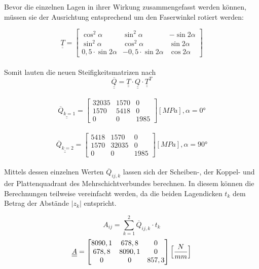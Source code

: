 \noindent Bevor die einzelnen Lagen in ihrer Wirkung zusammengefasst werden können, müssen sie der Ausrichtung entsprechend um den Faserwinkel rotiert werden:

\begin{equation}
	\underline{\underline{T}}=
	\begin{bmatrix}
		\cos^{2}\alpha&\sin^{2}\alpha&-\sin 2\alpha\\
		\sin^{2}\alpha&\cos^{2}\alpha&\sin 2\alpha\\
		0,5\cdot \sin2\alpha&-0,5\cdot\sin2\alpha&\cos 2\alpha
	\end{bmatrix}
\end{equation}\\

\noindent Somit lauten die neuen Steifigkeitsmatrizen nach 
\begin{equation}
	\overline{\underline{\underline{Q}}}=\underline{\underline{T}}\cdot \underline{\underline{Q}} \cdot \underline{\underline{T}}^{T}  
\end{equation}\\

\begin{equation}
\underline{\underline{\overline{Q}_{k=1}}}=
\begin{bmatrix}
	32035 & 1570 & 0\\
	1570 & 5418 & 0\\
	0 & 0 & 1985
\end{bmatrix} [MPa], \alpha = 0°
\end{equation}\\
\begin{equation}
	\underline{\underline{\overline{Q }_{k=2}}}=
	\begin{bmatrix}
		5418 & 1570 & 0\\
		1570 & 32035 & 0\\
		0 & 0 & 1985
	\end{bmatrix} [MPa], \alpha = 90°
\end{equation}\\

\noindent Mittels dessen einzelnen Werten $\overline{Q}_{ij, k}$ lassen sich der Scheiben-, der Koppel- und der Plattenquadrant des Mehrschichtverbundes berechnen. In diesem können die Berechnungen teilweise vereinfacht werden, da die beiden Lagendicken $t_{k}$ dem Betrag der Abstände $|z_{k}|$ entspricht.

\begin{equation}
	A_{ij}= \sum_{k=1}^{2} \overline{Q}_{ij,k}\cdot t_{k}
\end{equation}
\begin{equation} \underline{\underline{A}}=
	\begin{bmatrix}
		8090,1 & 678,8 & 0\\
		678,8 & 8090,1 & 0\\
		0 & 0 & 857,3\\
	\end{bmatrix} \Bigl[\frac{N}{mm}\Bigr]
\end{equation}


